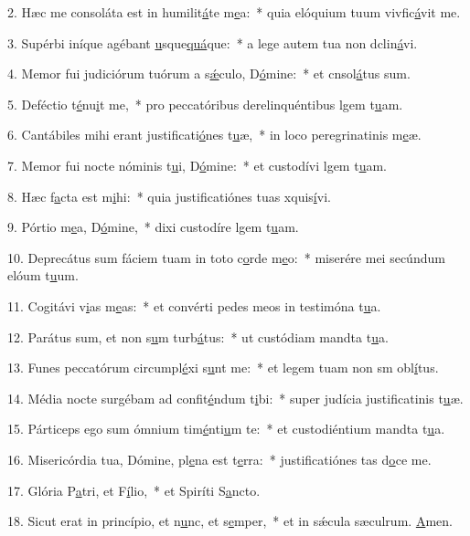 2. Hæc me consoláta est in humilit\uline{á}te m\uline{e}a:~* quia elóquium tuum vivfic\uline{á}vit me.\par 
3. Supérbi iníque agébant \uline{u}sque\uline{quá}que:~* a lege autem tua non dclin\uline{á}vi.\par 
4. Memor fui judiciórum tuórum a s\uline{ǽ}culo, D\uline{ó}mine:~* et cnsol\uline{á}tus sum.\par 
5. Deféctio t\uline{é}nu\uline{i}t me,~* pro peccatóribus derelinquéntibus lgem t\uline{u}am.\par 
6. Cantábiles mihi erant justificati\uline{ó}nes t\uline{u}æ,~* in loco peregrinatinis m\uline{e}æ.\par 
7. Memor fui nocte nóminis t\uline{u}i, D\uline{ó}mine:~* et custodívi lgem t\uline{u}am.\par 
8. Hæc f\uline{a}cta est m\uline{i}hi:~* quia justificatiónes tuas xquis\uline{í}vi.\par 
9. Pórtio m\uline{e}a, D\uline{ó}mine,~* dixi custodíre lgem t\uline{u}am.\par 
10. Deprecátus sum fáciem tuam in toto c\uline{o}rde m\uline{e}o:~* miserére mei secúndum elóum t\uline{u}um.\par 
11. Cogitávi v\uline{i}as m\uline{e}as:~* et convérti pedes meos in testimóna t\uline{u}a.\par 
12. Parátus sum, et non s\uline{u}m turb\uline{á}tus:~* ut custódiam mandta t\uline{u}a.\par 
13. Funes peccatórum circumpl\uline{é}xi s\uline{u}nt me:~* et legem tuam non sm obl\uline{í}tus.\par 
14. Média nocte surgébam ad confit\uline{é}ndum t\uline{i}bi:~* super judícia justificatinis t\uline{u}æ.\par 
15. Párticeps ego sum ómnium tim\uline{é}nti\uline{u}m te:~* et custodiéntium mandta t\uline{u}a.\par 
16. Misericórdia tua, Dómine, pl\uline{e}na est t\uline{e}rra:~* justificatiónes tas d\uline{o}ce me.\par 
17. Glória P\uline{a}tri, et F\uline{í}lio,~* et Spiríti S\uline{a}ncto.\par 
18. Sicut erat in princípio, et n\uline{u}nc, et s\uline{e}mper,~* et in sǽcula sæculrum. \uline{A}men.\par 

